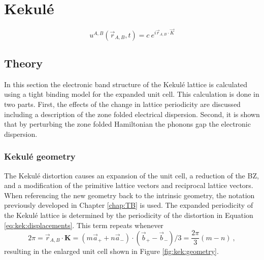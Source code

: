 \chapter{Kekul\'e \label{chap:kek}}

\begin{equation}
	u^{A,B}(\vec{r}_{A,B},t)=c \ e^{i \vec{r}_{A,B} \cdot \vec{K}} \label{eq:kek:displacements}
\end{equation}

\begin{figure}
	\begin{center}
	
	\end{center}
	\caption[]{}
\end{figure}

\section{Theory}
In this section the electronic band structure of the Kekul\'e lattice is calculated using a tight binding model for the expanded unit cell.
This calculation is done in two parts.
First, the effects of the change in lattice periodicity are discussed including a description of the zone folded electrical dispersion.
Second, it is shown that by perturbing the zone folded Hamiltonian the phonons gap the electronic dispersion.

\subsection{Kekul\'e geometry}
The Kekul\'e distortion causes an expansion of the unit cell, a reduction of the BZ, and a modification of the primitive lattice vectors and reciprocal lattice vectors.
When referencing the new geometry back to the intrinsic geometry, the notation previously developed in Chapter \ref{chap:TB} is used.
The expanded periodicity of the Kekul\'e lattice is determined by the periodicity of the distortion in Equation \ref{eq:kek:displacements}.
This term repeats whenever 
\begin{equation*}
	2 \pi=\vec{r}_{A,B} \cdot \bm{K}=(m \vec{a}_+ + n \vec{a}_-) \cdot (\vec{b}_+ - \vec{b}_-)/3=\frac{2 \pi}{3} (m-n) \ ,
\end{equation*}
resulting in the enlarged unit cell shown in Figure \ref{fig:kek:geometry}.

